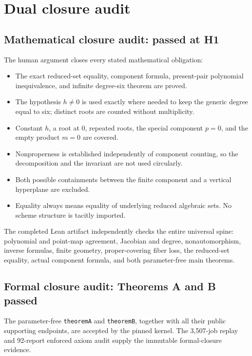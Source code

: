 \documentclass[11pt]{article}
\begin{document}
\section{Dual closure audit}

\subsection{Mathematical closure audit: passed at H1}

The human argument closes every stated mathematical obligation:
\begin{itemize}[leftmargin=2.1em,itemsep=0.25em]
 \item The exact reduced-set equality, component formula, present-pair
       polynomial inequivalence, and infinite degree-six theorem are proved.
 \item The hypothesis $h\ne0$ is used exactly where needed to keep the generic
       degree equal to six; distinct roots are counted without multiplicity.
 \item Constant $h$, a root at $0$, repeated roots, the special component
       $p=0$, and the empty product $m=0$ are covered.
 \item Nonproperness is established independently of component counting, so
       the decomposition and the invariant are not used circularly.
 \item Both possible containments between the finite component and a vertical
       hyperplane are excluded.
 \item Equality always means equality of underlying reduced algebraic sets.
       No scheme structure is tacitly imported.
\end{itemize}

The completed Lean artifact independently checks the entire universal spine:
polynomial and point-map agreement, Jacobian and degree, nonautomorphism,
inverse formulas, finite geometry, proper-covering fiber loss, the reduced-set
equality, actual component formula, and both parameter-free main theorems.

\subsection{Formal closure audit: Theorems A and B passed}

The parameter-free \texttt{theoremA} and \texttt{theoremB}, together with all
their public supporting endpoints, are accepted by the pinned kernel.  The
3,507-job replay and 92-report enforced axiom audit supply the immutable
formal-closure evidence.
\end{document}
